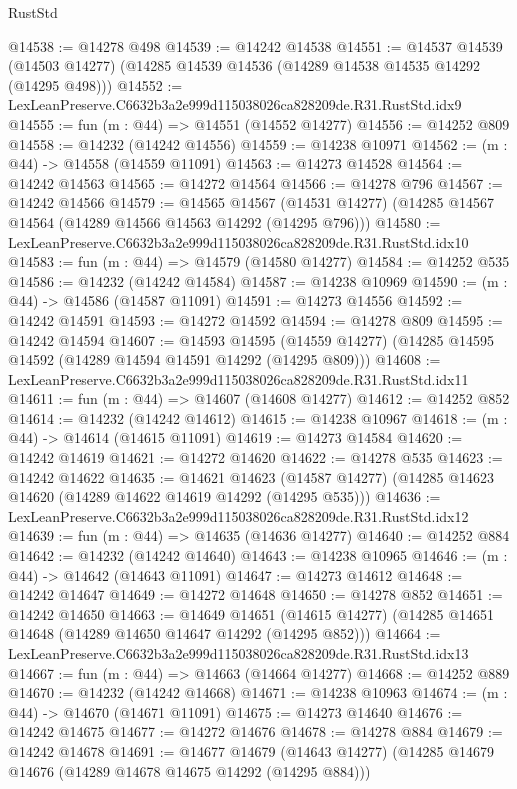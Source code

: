 \begin{lexlean}{RustStd}
\begin{coremodule}
@14538 := @14278 @498
@14539 := @14242 @14538
@14551 := @14537
    @14539
    (@14503 @14277)
    (@14285 @14539 @14536 (@14289 @14538 @14535 @14292 (@14295 @498)))
@14552 := LexLeanPreserve.C6632b3a2e999d115038026ca828209de.R31.RustStd.idx9
@14555 := fun (m : @44) => @14551 (@14552 @14277)
@14556 := @14252 @809
@14558 := @14232 (@14242 @14556)
@14559 := @14238 @10971
@14562 := (m : @44) -> @14558 (@14559 @11091)
@14563 := @14273 @14528
@14564 := @14242 @14563
@14565 := @14272 @14564
@14566 := @14278 @796
@14567 := @14242 @14566
@14579 := @14565
    @14567
    (@14531 @14277)
    (@14285 @14567 @14564 (@14289 @14566 @14563 @14292 (@14295 @796)))
@14580 := LexLeanPreserve.C6632b3a2e999d115038026ca828209de.R31.RustStd.idx10
@14583 := fun (m : @44) => @14579 (@14580 @14277)
@14584 := @14252 @535
@14586 := @14232 (@14242 @14584)
@14587 := @14238 @10969
@14590 := (m : @44) -> @14586 (@14587 @11091)
@14591 := @14273 @14556
@14592 := @14242 @14591
@14593 := @14272 @14592
@14594 := @14278 @809
@14595 := @14242 @14594
@14607 := @14593
    @14595
    (@14559 @14277)
    (@14285 @14595 @14592 (@14289 @14594 @14591 @14292 (@14295 @809)))
@14608 := LexLeanPreserve.C6632b3a2e999d115038026ca828209de.R31.RustStd.idx11
@14611 := fun (m : @44) => @14607 (@14608 @14277)
@14612 := @14252 @852
@14614 := @14232 (@14242 @14612)
@14615 := @14238 @10967
@14618 := (m : @44) -> @14614 (@14615 @11091)
@14619 := @14273 @14584
@14620 := @14242 @14619
@14621 := @14272 @14620
@14622 := @14278 @535
@14623 := @14242 @14622
@14635 := @14621
    @14623
    (@14587 @14277)
    (@14285 @14623 @14620 (@14289 @14622 @14619 @14292 (@14295 @535)))
@14636 := LexLeanPreserve.C6632b3a2e999d115038026ca828209de.R31.RustStd.idx12
@14639 := fun (m : @44) => @14635 (@14636 @14277)
@14640 := @14252 @884
@14642 := @14232 (@14242 @14640)
@14643 := @14238 @10965
@14646 := (m : @44) -> @14642 (@14643 @11091)
@14647 := @14273 @14612
@14648 := @14242 @14647
@14649 := @14272 @14648
@14650 := @14278 @852
@14651 := @14242 @14650
@14663 := @14649
    @14651
    (@14615 @14277)
    (@14285 @14651 @14648 (@14289 @14650 @14647 @14292 (@14295 @852)))
@14664 := LexLeanPreserve.C6632b3a2e999d115038026ca828209de.R31.RustStd.idx13
@14667 := fun (m : @44) => @14663 (@14664 @14277)
@14668 := @14252 @889
@14670 := @14232 (@14242 @14668)
@14671 := @14238 @10963
@14674 := (m : @44) -> @14670 (@14671 @11091)
@14675 := @14273 @14640
@14676 := @14242 @14675
@14677 := @14272 @14676
@14678 := @14278 @884
@14679 := @14242 @14678
@14691 := @14677
    @14679
    (@14643 @14277)
    (@14285 @14679 @14676 (@14289 @14678 @14675 @14292 (@14295 @884)))

\end{coremodule}
\end{lexlean}
